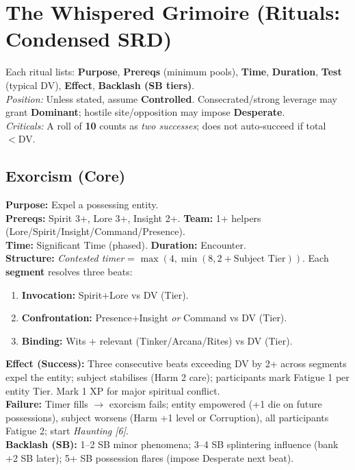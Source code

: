 \newpage
\section{The Whispered Grimoire (Rituals: Condensed SRD)}\label{sec:rituals_condensed}

\begin{tcolorbox}[title=Rituals (SRD Format),colback=gray!4,colframe=black!60,breakable]
Each ritual lists: \textbf{Purpose}, \textbf{Prereqs} (minimum pools), \textbf{Time}, \textbf{Duration}, \textbf{Test} (typical DV), \textbf{Effect}, \textbf{Backlash (SB tiers)}.\\
\emph{Position:} Unless stated, assume \textbf{Controlled}. Consecrated/strong leverage may grant \textbf{Dominant}; hostile site/opposition may impose \textbf{Desperate}.\\
\emph{Criticals:} A roll of \textbf{10} counts as \emph{two successes}; does not auto‑succeed if total $< \mathrm{DV}$.
\end{tcolorbox}

\subsection*{Exorcism (Core)}
\textbf{Purpose:} Expel a possessing entity. \\
\textbf{Prereqs:} Spirit 3+, Lore 3+, Insight 2+. \quad \textbf{Team:} 1+ helpers (Lore/Spirit/Insight/Command/Presence). \\
\textbf{Time:} Significant Time (phased). \quad \textbf{Duration:} Encounter.\\
\textbf{Structure:} \emph{Contested timer} = \(\max(4,\min(8, 2 + \text{Subject Tier}))\). Each \textbf{segment} resolves three beats:
\begin{enumerate}
    \item \textbf{Invocation:} Spirit+Lore vs DV (Tier).
    \item \textbf{Confrontation:} Presence+Insight \emph{or} Command vs DV (Tier).
    \item \textbf{Binding:} Wits + relevant (Tinker/Arcana/Rites) vs DV (Tier).
\end{enumerate}
\textbf{Effect (Success):} Three consecutive beats exceeding DV by 2+ across segments expel the entity; subject stabilises (Harm 2 care); participants mark Fatigue 1 per entity Tier. Mark 1 XP for major spiritual conflict.\\
\textbf{Failure:} Timer fills $\rightarrow$ exorcism fails; entity empowered (+1 die on future possessions), subject worsens (Harm +1 level or Corruption), all participants Fatigue 2; start \emph{Haunting [6]}.\\
\textbf{Backlash (SB):} 1--2 SB minor phenomena; 3--4 SB splintering influence (bank +2 SB later); 5+ SB possession flares (impose Desperate next beat).

